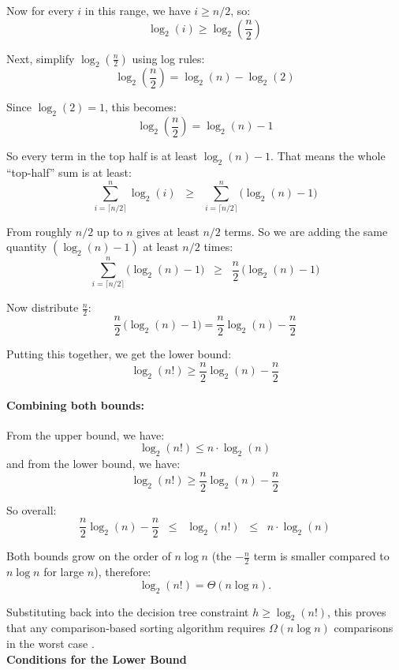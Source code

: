 \documentclass[12pt]{article}
\begin{document}
\noindent Now for every $i$ in this range, we have $i \ge n/2$, so:
\[
\log_2(i) \ge \log_2\!\left(\frac{n}{2}\right)
\]

\noindent Next, simplify $\log_2\!\left(\frac{n}{2}\right)$ using log rules:
\[
\log_2\!\left(\frac{n}{2}\right)
=
\log_2(n) - \log_2(2)
\]

\noindent Since $\log_2(2)=1$, this becomes:
\[
\log_2\!\left(\frac{n}{2}\right) = \log_2(n) - 1
\]

\noindent So every term in the top half is at least $\log_2(n)-1$. That means the whole “top-half” sum is at least:
\[
\sum_{i=\lceil n/2 \rceil}^{n} \log_2(i)
\;\;\ge\;\;
\sum_{i=\lceil n/2 \rceil}^{n} \bigl(\log_2(n)-1\bigr)
\]

\noindent From roughly $n/2$ up to $n$ gives at least $n/2$ terms. So we are adding the same quantity $(\log_2(n)-1)$ at least $n/2$ times:
\[
\sum_{i=\lceil n/2 \rceil}^{n} \bigl(\log_2(n)-1\bigr)
\;\;\ge\;\;
\frac{n}{2}\,\bigl(\log_2(n)-1\bigr)
\]

\noindent Now distribute $\frac{n}{2}$:
\[
\frac{n}{2}\,\bigl(\log_2(n)-1\bigr)
=
\frac{n}{2}\log_2(n) - \frac{n}{2}
\]

\noindent Putting this together, we get the lower bound:
\[
\log_2(n!) \ge \frac{n}{2}\log_2(n) - \frac{n}{2}
\]

\paragraph{Combining both bounds:}
\noindent From the upper bound, we have:
\[
\log_2(n!) \leq n \cdot \log_2(n)
\]
\noindent and from the lower bound, we have:
\[
\log_2(n!) \ge \frac{n}{2}\log_2(n) - \frac{n}{2}
\]

\noindent So overall:
\[
\frac{n}{2}\log_2(n) - \frac{n}{2}
\;\;\leq\;\;
\log_2(n!)
\;\;\leq\;\;
n \cdot \log_2(n)
\]

\noindent Both bounds grow on the order of $n\log n$ (the $-\frac{n}{2}$ term is smaller compared to $n\log n$ for large $n$), therefore:
\[
\log_2(n!) = \Theta(n \log n).
\]

Substituting back into the decision tree constraint $h \geq \log_2(n!)$, this proves that any comparison-based sorting algorithm requires $\Omega(n \log n)$ comparisons in the worst case \parencite{cormen2009,knuth1998}. \\

\noindent\textbf{Conditions for the Lower Bound}
\end{document}
